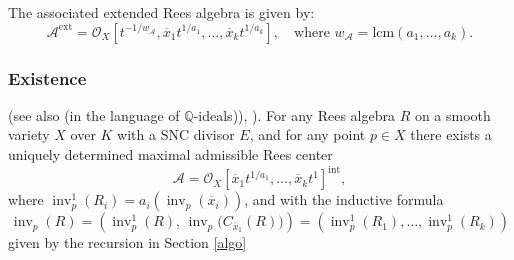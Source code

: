 \documentclass{amsart}
\newcommand{\QQ}{{\mathbb{Q}}}
\newcommand{\cA}{{\mathcal A}}
\newcommand{\cO}{{\mathcal O}}
\newcommand{\Int}{{\operatorname{Int}}}
\newcommand{\ord}{{\operatorname{ord}}}
\newcommand{\inv}{{\operatorname{inv}}}
\newcommand{\inte}{{\operatorname{int}}}
\begin{document}
The associated extended Rees algebra is given by:
\[
\mathcal{A}^{\mathrm{ext}} = \mathcal{O}_X\left[t^{-1/w_\cA}, \overline{x}_1 t^{1/a_1}, \ldots, \overline{x}_k t^{1/a_k}\right], \quad \text{where } w_\cA = \mathrm{lcm}(a_1, \ldots, a_k).
\]

\subsubsection{Existence}
\begin{proposition} \label{exi}  \label{ind}(see also \cite[Theorem 5.3.1]{ATW-principalization} (in the language of $\QQ$-ideals)), ). For any Rees algebra $R$ on a smooth variety $X$ over $K$ with a SNC divisor $E$, and for any point $p\in X$ there exists a uniquely  determined maximal admissible Rees center  $$\cA=\cO_X[\overline{x}_1t^{1/a_1},\ldots, \overline{x}_k t^{1}]^\inte,$$  where $\inv^1_p(R_i)=a_i(\inv_p(\overline{x}_i))$, and  with the inductive formula
\[
\inv_p(R) = \left( \inv^1_p(R),\, \inv_p\big(C_{\overline{x}_1}(R)\big) \right)=\left( \inv^1_p(R_1),\ldots,\inv^1_p(R_k) \right)
\]
 given by the recursion in Section \ref{algo}

\end{proposition}
\end{document}
